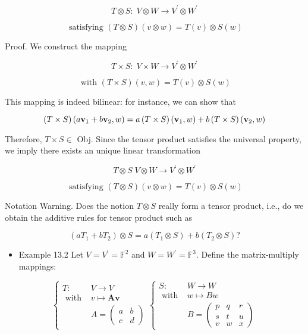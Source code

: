 \documentclass[11pt]{article}
\begin{document}
\[
T \otimes  S : \;V \otimes  W \rightarrow  {V}^{\prime } \otimes  {W}^{\prime }
\]

\[
\text{ satisfying }\left( {T \otimes  S}\right) \left( {v \otimes  w}\right)  = T\left( v\right)  \otimes  S\left( w\right)
\]

Proof. We construct the mapping

\[
T \times  S : \;V \times  W \rightarrow  {V}^{\prime } \otimes  {W}^{\prime }
\]

\[
\text{ with }\left( {T \times  S}\right) \left( {v,w}\right)  = T\left( v\right)  \otimes  S\left( w\right)
\]

This mapping is indeed bilinear: for instance, we can show that

\[
\left( {T \times  S}\right) \left( {a{\bf v}_1 + b{\bf v}_2,w}\right)  = a\left( {T \times  S}\right) \left( {{\bf v}_1,w}\right)  + b\left( {T \times  S}\right) \left( {{\bf v}_2,w}\right)
\]

Therefore, \(T \times  S \in\) Obj. Since the tensor product satisfies the universal property, we imply there exists an unique linear transformation

\[
T \otimes  S\;V \otimes  W \rightarrow  {V}^{\prime } \otimes  {W}^{\prime }
\]

\[
\text{ satisfying }\left( {T \otimes  S}\right) \left( {v \otimes  w}\right)  = T\left( v\right)  \otimes  S\left( w\right)
\]

Notation Warning. Does the notion \(T \otimes  S\) really form a tensor product, i.e., do we obtain the additive rules for tensor product such as

\[
\left( {a{T}_1 + b{T}_2}\right)  \otimes  S = a\left( {{T}_1 \otimes  S}\right)  + b\left( {{T}_2 \otimes  S}\right) ?
\]

\begin{itemize}
\item Example 13.2 Let \(V = {V}^{\prime } = {\mathbb{F}}^2\) and \(W = {W}^{\prime } = {\mathbb{F}}^{3}\). Define the matrix-multiply mappings:
\end{itemize}

\[
\left\{  {\begin{array}{ll} T : & V \rightarrow  V \\  \text{ with } & v \mapsto  \mathbf{{Av}} \\   & A = \left( \begin{array}{ll} a & b \\  c & d \end{array}\right)  \end{array}\left\{  \begin{array}{ll} S : & W \rightarrow  W \\  \text{ with } & w \mapsto  Bw \\   & B = \left( \begin{array}{lll} p & q & r \\  s & t & u \\  v & w & x \end{array}\right)  \end{array}\right. }\right.
\]
\end{document}
